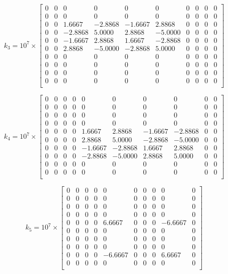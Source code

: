 \documentclass[8pt]{article}
\begin{document}
\[
k_3 = 10^7 \times
\begin{bmatrix}
0 & 0 & 0 & 0 & 0 & 0 & 0 & 0 & 0 & 0 \\
0 & 0 & 0 & 0 & 0 & 0 & 0 & 0 & 0 & 0 \\
0 & 0 & 1.6667 & -2.8868 & -1.6667 & 2.8868 & 0 & 0 & 0 & 0 \\
0 & 0 & -2.8868 & 5.0000 & 2.8868 & -5.0000 & 0 & 0 & 0 & 0 \\
0 & 0 & -1.6667 & 2.8868 & 1.6667 & -2.8868 & 0 & 0 & 0 & 0 \\
0 & 0 & 2.8868 & -5.0000 & -2.8868 & 5.0000 & 0 & 0 & 0 & 0 \\
0 & 0 & 0 & 0 & 0 & 0 & 0 & 0 & 0 & 0 \\
0 & 0 & 0 & 0 & 0 & 0 & 0 & 0 & 0 & 0 \\
0 & 0 & 0 & 0 & 0 & 0 & 0 & 0 & 0 & 0 \\
0 & 0 & 0 & 0 & 0 & 0 & 0 & 0 & 0 & 0 \\
\end{bmatrix}
\]

\[
k_4 = 10^7 \times
\begin{bmatrix}
0 & 0 & 0 & 0 & 0 & 0 & 0 & 0 & 0 & 0 \\
0 & 0 & 0 & 0 & 0 & 0 & 0 & 0 & 0 & 0 \\
0 & 0 & 0 & 0 & 0 & 0 & 0 & 0 & 0 & 0 \\
0 & 0 & 0 & 0 & 0 & 0 & 0 & 0 & 0 & 0 \\
0 & 0 & 0 & 0 & 1.6667 & 2.8868 & -1.6667 & -2.8868 & 0 & 0 \\
0 & 0 & 0 & 0 & 2.8868 & 5.0000 & -2.8868 & -5.0000 & 0 & 0 \\
0 & 0 & 0 & 0 & -1.6667 & -2.8868 & 1.6667 & 2.8868 & 0 & 0 \\
0 & 0 & 0 & 0 & -2.8868 & -5.0000 & 2.8868 & 5.0000 & 0 & 0 \\
0 & 0 & 0 & 0 & 0 & 0 & 0 & 0 & 0 & 0 \\
0 & 0 & 0 & 0 & 0 & 0 & 0 & 0 & 0 & 0 \\
\end{bmatrix}
\]

\[
k_5 = 10^7 \times
\begin{bmatrix}
0 & 0 & 0 & 0 & 0 & 0 & 0 & 0 & 0 & 0 \\
0 & 0 & 0 & 0 & 0 & 0 & 0 & 0 & 0 & 0 \\
0 & 0 & 0 & 0 & 0 & 0 & 0 & 0 & 0 & 0 \\
0 & 0 & 0 & 0 & 0 & 0 & 0 & 0 & 0 & 0 \\
0 & 0 & 0 & 0 & 6.6667 & 0 & 0 & 0 & -6.6667 & 0 \\
0 & 0 & 0 & 0 & 0 & 0 & 0 & 0 & 0 & 0 \\
0 & 0 & 0 & 0 & 0 & 0 & 0 & 0 & 0 & 0 \\
0 & 0 & 0 & 0 & 0 & 0 & 0 & 0 & 0 & 0 \\
0 & 0 & 0 & 0 & -6.6667 & 0 & 0 & 0 & 6.6667 & 0 \\
0 & 0 & 0 & 0 & 0 & 0 & 0 & 0 & 0 & 0 \\
\end{bmatrix}
\]
\end{document}
